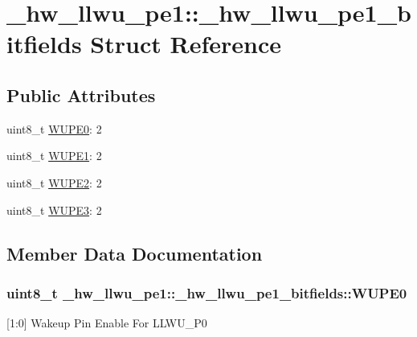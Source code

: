 \hypertarget{struct__hw__llwu__pe1_1_1__hw__llwu__pe1__bitfields}{}\section{\+\_\+hw\+\_\+llwu\+\_\+pe1\+:\+:\+\_\+hw\+\_\+llwu\+\_\+pe1\+\_\+bitfields Struct Reference}
\label{struct__hw__llwu__pe1_1_1__hw__llwu__pe1__bitfields}
\subsection*{Public Attributes}
\begin{DoxyCompactItemize}
\item 
uint8\+\_\+t \hyperlink{struct__hw__llwu__pe1_1_1__hw__llwu__pe1__bitfields_ada0fef926e46c42317cb212bf8a719fc}{W\+U\+P\+E0}\+: 2
\item 
uint8\+\_\+t \hyperlink{struct__hw__llwu__pe1_1_1__hw__llwu__pe1__bitfields_a13c9579f5c69b2929a8a219fcebd815c}{W\+U\+P\+E1}\+: 2
\item 
uint8\+\_\+t \hyperlink{struct__hw__llwu__pe1_1_1__hw__llwu__pe1__bitfields_a7989c97c33caa1c9d314ff9b05ab4c7e}{W\+U\+P\+E2}\+: 2
\item 
uint8\+\_\+t \hyperlink{struct__hw__llwu__pe1_1_1__hw__llwu__pe1__bitfields_a2820d33f1de85071a95eb0493834c9a9}{W\+U\+P\+E3}\+: 2
\end{DoxyCompactItemize}


\subsection{Member Data Documentation}
\subsubsection[{\texorpdfstring{W\+U\+P\+E0}{WUPE0}}]{\setlength{\rightskip}{0pt plus 5cm}uint8\+\_\+t \+\_\+hw\+\_\+llwu\+\_\+pe1\+::\+\_\+hw\+\_\+llwu\+\_\+pe1\+\_\+bitfields\+::\+W\+U\+P\+E0}\hypertarget{struct__hw__llwu__pe1_1_1__hw__llwu__pe1__bitfields_ada0fef926e46c42317cb212bf8a719fc}{}\label{struct__hw__llwu__pe1_1_1__hw__llwu__pe1__bitfields_ada0fef926e46c42317cb212bf8a719fc}
\mbox{[}1\+:0\mbox{]} Wakeup Pin Enable For L\+L\+W\+U\+\_\+\+P0 
